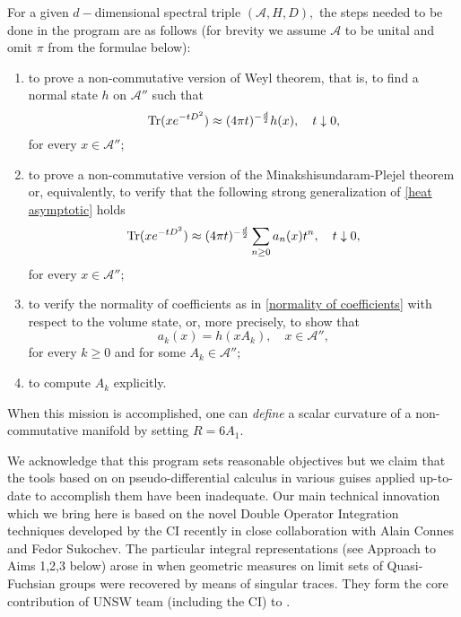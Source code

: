 \documentclass[12pt]{article}
\begin{document}

For a given $d-$dimensional spectral triple $(\mathcal{A},H,D),$ the steps needed to be done in the program are as follows (for brevity we assume $\mathcal{A}$ to be unital and omit $\pi$ from the formulae below):
\begin{enumerate}
\item\label{raph1} to prove a non-commutative version of Weyl theorem, that is, to find a normal state $h$ on $\mathcal{A}''$ such that  
\begin{equation}\label{raph1 eq}
{\rm Tr}(xe^{-tD^2})\approx (4\pi t)^{-\frac{d}{2}} h(x),\quad t\downarrow0,
\end{equation}
for every $x\in\mathcal{A}'';$
\item\label{raph2} to prove a non-commutative version of the Minakshisundaram-Plejel theorem or, equivalently, to verify that the following strong generalization of \eqref{heat asymptotic} holds
$${\rm Tr}(xe^{-tD^2})\approx (4\pi t)^{-\frac{d}{2}} \sum_{n\geq0}a_n(x)t^n,\quad t\downarrow0,$$
for every $x\in \mathcal{A}'';$ 
\item\label{raph3} to verify the normality of coefficients as in \eqref{normality of coefficients} with respect to the volume state, or, more precisely, to show that
$$a_k(x)=h(xA_k),\quad x\in\mathcal{A}'',$$
for every $k\geq0$ and for some $A_k\in\mathcal{A}'';$ 
\item\label{raph4} to compute $A_k$ explicitly.
\end{enumerate}
When this mission is accomplished, one can {\it define} a scalar curvature of a non-commutative manifold by setting $R=6A_1.$

We acknowledge that this program sets reasonable objectives but we claim that the tools based on on pseudo-differential calculus in various guises applied up-to-date to accomplish them have been inadequate. Our main technical innovation which we bring here is based on the novel Double Operator Integration techniques developed by the CI recently in close collaboration with Alain Connes and Fedor Sukochev. The particular integral representations (see Approach to Aims 1,2,3 below) arose in \cite{Connes_team} when geometric measures on limit sets of Quasi-Fuchsian groups were recovered by means of singular traces. They form the core contribution of UNSW team (including the CI) to \cite{Connes_team}.
\end{document}
